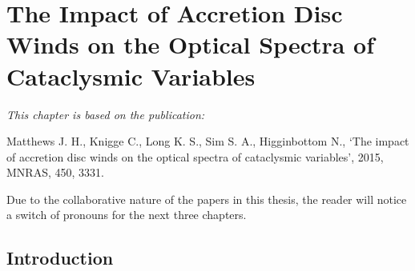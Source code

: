%
%


\chapter{The Impact of Accretion Disc Winds on the Optical Spectra of Cataclysmic Variables}

{\em This chapter is based on the publication:

Matthews J. H., Knigge C., Long K. S., Sim S. A., Higginbottom N., 
`The impact of accretion disc winds on the optical spectra of 
cataclysmic variables',
2015, MNRAS, 450, 3331.

Due to the collaborative nature
of the papers in this thesis, the reader will notice a switch of pronouns
for the next three chapters.}
%
%

\section{Introduction} 
\label{sec:intro}



